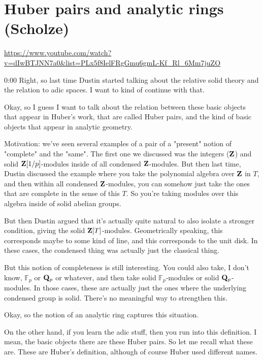
\section{\ufs Huber pairs and analytic rings (Scholze)}

\url{https://www.youtube.com/watch?v=dIwBTJNN7a0&list=PLx5f8IelFRgGmu6gmL-Kf_Rl_6Mm7juZO}
\renewcommand{\yt}[2]{\href{https://www.youtube.com/watch?v=dIwBTJNN7a0&list=PLx5f8IelFRgGmu6gmL-Kf_Rl_6Mm7juZO&t=#1}{#2}}
\vspace{1em}

\begin{unfinished}{0:00}
  Right, so last time Dustin started talking about the relative solid theory and the relation to adic spaces. I want to kind of continue with that.

Okay, so I guess I want to talk about the relation between these basic objects that appear in Huber's work, that are called Huber pairs, and the kind of basic objects that appear in analytic geometry.

Motivation: we've seen several examples of a pair of a "present" notion of "complete" and the "same". The first one we discussed was the integers ($\mathbf Z$) and solid $\mathbf Z[1/p]$-modules inside of all condensed $\mathbf Z$-modules. But then last time, Dustin discussed the example where you take the polynomial algebra over $\mathbf Z$ in $T$, and then within all condensed $\mathbf Z$-modules, you can somehow just take the ones that are complete in the sense of this $T$. So you're taking modules over this algebra inside of solid abelian groups.

But then Dustin argued that it's actually quite natural to also isolate a stronger condition, giving the solid $\mathbf Z[T]$-modules. Geometrically speaking, this corresponds maybe to some kind of line, and this corresponds to the unit disk. In these cases, the condensed thing was actually just the classical thing.

But this notion of completeness is still interesting. You could also take, I don't know, $\mathbb{F}_p$ or $\mathbf Q_p$ or whatever, and then take solid $\mathbb{F}_p$-modules or solid $\mathbf Q_p$-modules. In those cases, these are actually just the ones where the underlying condensed group is solid. There's no meaningful way to strengthen this.

Okay, so the notion of an analytic ring captures this situation.

On the other hand, if you learn the adic stuff, then you run into this definition. I mean, the basic objects there are these Huber pairs. So let me recall what these are. These are Huber's definition, although of course Huber used different names.


\end{unfinished}
